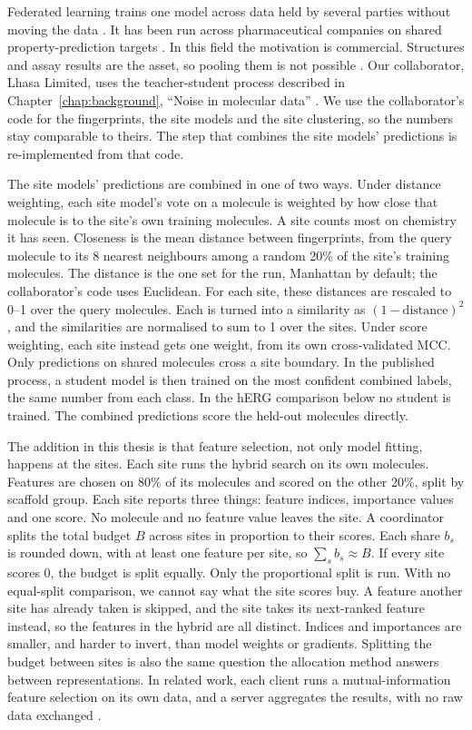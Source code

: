 Federated learning trains one model across data held by several parties without moving the data \citep{McMahan2017}. It has been run across pharmaceutical companies on shared property-prediction targets \citep{Heyndrickx2024}. In this field the motivation is commercial. Structures and assay results are the asset, so pooling them is not possible \citep{Hanser2023,Bassani2023}. Our collaborator, Lhasa Limited, uses the teacher-student process described in Chapter~\ref{chap:background}, ``Noise in molecular data'' \citep{Hanser2025}. We use the collaborator's code for the fingerprints, the site models and the site clustering, so the numbers stay comparable to theirs. The step that combines the site models' predictions is re-implemented from that code.

The site models' predictions are combined in one of two ways. Under distance weighting, each site model's vote on a molecule is weighted by how close that molecule is to the site's own training molecules. A site counts most on chemistry it has seen. Closeness is the mean distance between fingerprints, from the query molecule to its 8 nearest neighbours among a random 20\% of the site's training molecules. The distance is the one set for the run, Manhattan by default; the collaborator's code uses Euclidean. For each site, these distances are rescaled to 0--1 over the query molecules. Each is turned into a similarity as $(1 - \text{distance})^2$, and the similarities are normalised to sum to 1 over the sites. Under score weighting, each site instead gets one weight, from its own cross-validated MCC. Only predictions on shared molecules cross a site boundary. In the published process, a student model is then trained on the most confident combined labels, the same number from each class. In the hERG comparison below no student is trained. The combined predictions score the held-out molecules directly.

The addition in this thesis is that feature selection, not only model fitting, happens at the sites. Each site runs the hybrid search on its own molecules. Features are chosen on 80\% of its molecules and scored on the other 20\%, split by scaffold group. Each site reports three things: feature indices, importance values and one score. No molecule and no feature value leaves the site. A coordinator splits the total budget $B$ across sites in proportion to their scores. Each share $b_s$ is rounded down, with at least one feature per site, so $\sum_s b_s \approx B$. If every site scores 0, the budget is split equally. Only the proportional split is run. With no equal-split comparison, we cannot say what the site scores buy. A feature another site has already taken is skipped, and the site takes its next-ranked feature instead, so the features in the hybrid are all distinct. Indices and importances are smaller, and harder to invert, than model weights or gradients. Splitting the budget between sites is also the same question the allocation method answers between representations. In related work, each client runs a mutual-information feature selection on its own data, and a server aggregates the results, with no raw data exchanged \citep{Cassara2022}.

